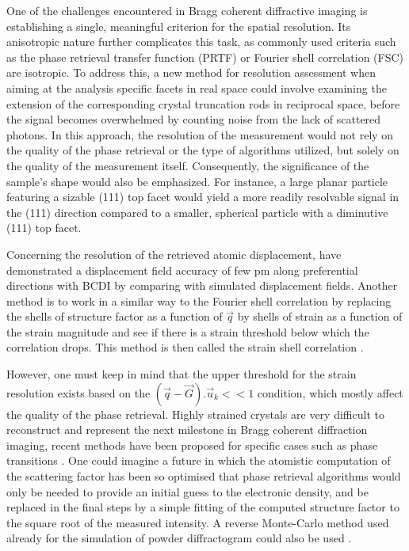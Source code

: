 One of the challenges encountered in Bragg coherent diffractive imaging is establishing a single, meaningful criterion for the spatial resolution.
Its anisotropic nature further complicates this task, as commonly used criteria such as the phase retrieval transfer function (PRTF) or Fourier shell correlation (FSC) are isotropic.
To address this, a new method for resolution assessment when aiming at the analysis specific facets in real space could involve examining the extension of the corresponding crystal truncation rods in reciprocal space, before the signal becomes overwhelmed by counting noise from the lack of scattered photons.
In this approach, the resolution of the measurement would not rely on the quality of the phase retrieval or the type of algorithms utilized, but solely on the quality of the measurement itself.
Consequently, the significance of the sample's shape would also be emphasized.
For instance, a large planar particle featuring a sizable (111) top facet would yield a more readily resolvable signal in the (111) direction compared to a smaller, spherical particle with a diminutive (111) top facet.

Concerning the resolution of the retrieved atomic displacement, \cite{Labat2015} have demonstrated a displacement field accuracy of few pm along preferential directions with BCDI by comparing with simulated displacement fields.
Another method is to work in a similar way to the Fourier shell correlation by replacing the shells of structure factor as a function of $\vec{q}$ by shells of strain as a function of the strain magnitude and see if there is a strain threshold below which the correlation drops.
This method is then called the strain shell correlation \parencite{Girard2020}.

However, one must keep in mind that the upper threshold for the strain resolution exists based on the $(\vec{q}-\vec{G}).\vec{u}_k<<1$ condition, which mostly affect the quality of the phase retrieval.
Highly strained crystals are very difficult to reconstruct and represent the next milestone in Bragg coherent diffraction imaging, recent methods have been proposed for specific cases such as phase transitions \parencite{Wang2020}.
One could imagine a future in which the atomistic computation of the scattering factor has been so optimised that phase retrieval algorithms would only be needed to provide an initial guess to the electronic density, and be replaced in the final steps by a simple fitting of the computed structure factor to the square root of the measured intensity.
A reverse Monte-Carlo method used already for the simulation of powder diffractogram could also be used \parencite{RLMcGreevy2001}.

